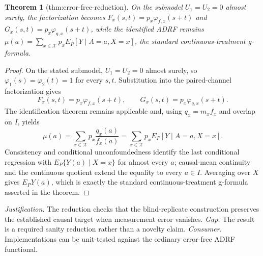 \documentclass{article}
\newtheorem{theorem}{Theorem}
\begin{document}
\begin{theorem}[thm:error-free-reduction]\label{thm:error-free-reduction}
On the submodel \(U_1=U_2=0\) almost surely, the factorization becomes \(F_x(s,t)=p_x\varphi_{f,x}(s+t)\) and \(G_x(s,t)=p_x\varphi_{q,x}(s+t)\), while the identified ADRF remains \(\mu(a)=\sum_{x\in\mathcal X}p_xE_P[Y\mid A=a,X=x]\), the standard continuous-treatment g-formula.
\end{theorem}
\begin{proof}
On the stated submodel, \(U_1=U_2=0\) almost surely, so \(\varphi_1(s)=\varphi_2(t)=1\) for every \(s,t\).  Substitution into the paired-channel factorization gives
\[
F_x(s,t)=p_x\varphi_{f,x}(s+t),
\qquad
G_x(s,t)=p_x\varphi_{q,x}(s+t).
\]
The identification theorem remains applicable and, using \(q_x=m_xf_x\) and overlap on \(I\), yields
\[
\mu(a)=\sum_{x\in\mathcal X}p_x\frac{q_x(a)}{f_x(a)}
=\sum_{x\in\mathcal X}p_xE_P[Y\mid A=a,X=x].
\]
Consistency and conditional unconfoundedness identify the last conditional regression with \(E_P\{Y(a)\mid X=x\}\) for almost every \(a\); causal-mean continuity and the continuous quotient extend the equality to every \(a\in I\).  Averaging over \(X\) gives \(E_PY(a)\), which is exactly the standard continuous-treatment g-formula asserted in the theorem.
\end{proof}
\par\smallskip\noindent \textit{Justification.} The reduction checks that the blind-replicate construction preserves the established causal target when measurement error vanishes. \textit{Gap.} The result is a required sanity reduction rather than a novelty claim. \textit{Consumer.} Implementations can be unit-tested against the ordinary error-free ADRF functional.
\end{document}
